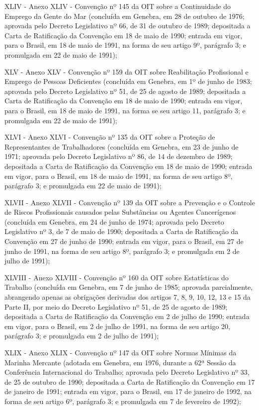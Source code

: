 \documentclass[
]{book}
\begin{document}
XLIV - Anexo XLIV - Convenção nº 145 da OIT sobre a Continuidade do Emprego da Gente do Mar (concluída em Genebra, em 28 de outubro de 1976; aprovada pelo Decreto Legislativo nº 66, de 31 de outubro de 1989; depositada a Carta de Ratificação da Convenção em 18 de maio de 1990; entrada em vigor, para o Brasil, em 18 de maio de 1991, na forma de seu artigo 9º, parágrafo 3; e promulgada em 22 de maio de 1991);

XLV - Anexo XLV - Convenção nº 159 da OIT sobre Reabilitação Profissional e Emprego de Pessoas Deficientes (concluída em Genebra, em 1º de junho de 1983; aprovada pelo Decreto Legislativo nº 51, de 25 de agosto de 1989; depositada a Carta de Ratificação da Convenção em 18 de maio de 1990; entrada em vigor, para o Brasil, em 18 de maio de 1991, na forma se seu artigo 11, parágrafo 3; e promulgada em 22 de maio de 1991);

XLVI - Anexo XLVI - Convenção nº 135 da OIT sobre a Proteção de Representantes de Trabalhadores (concluída em Genebra, em 23 de junho de 1971; aprovada pelo Decreto Legislativo nº 86, de 14 de dezembro de 1989; depositada a Carta de Ratificação da Convenção em 18 de maio de 1990; entrada em vigor, para o Brasil, em 18 de maio de 1991, na forma de seu artigo 8º, parágrafo 3; e promulgada em 22 de maio de 1991);

XLVII - Anexo XLVII - Convenção nº 139 da OIT sobre a Prevenção e o Controle de Riscos Profissionais causados pelas Substâncias ou Agentes Cancerígenos (concluída em Genebra, em 24 de junho de 1974; aprovada pelo Decreto Legislativo nº 3, de 7 de maio de 1990; depositada a Carta de Ratificação da Convenção em 27 de junho de 1990; entrada em vigor, para o Brasil, em 27 de junho de 1991, na forma de seu artigo 8º, parágrafo 3; e promulgada em 2 de julho de 1991);

XLVIII - Anexo XLVIII - Convenção nº 160 da OIT sobre Estatísticas do Trabalho (concluída em Genebra, em 7 de junho de 1985; aprovada parcialmente, abrangendo apenas as obrigações derivadas dos artigos 7, 8, 9, 10, 12, 13 e 15 da Parte II, por meio do Decreto Legislativo nº 51, de 25 de agosto de 1989; depositada a Carta de Ratificação da Convenção em 2 de julho de 1990; entrada em vigor, para o Brasil, em 2 de julho de 1991, na forma de seu artigo 20, parágrafo 3; e promulgada em 2 de julho de 1991);

XLIX - Anexo XLIX - Convenção nº 147 da OIT sobre Normas Mínimas da Marinha Mercante (adotada em Genebra, em 1976, durante a 62ª Sessão da Conferência Internacional do Trabalho; aprovada pelo Decreto Legislativo nº 33, de 25 de outubro de 1990; depositada a Carta de Ratificação da Convenção em 17 de janeiro de 1991; entrada em vigor, para o Brasil, em 17 de janeiro de 1992, na forma de seu artigo 6º, parágrafo 3; e promulgada em 7 de fevereiro de 1992);
\end{document}
